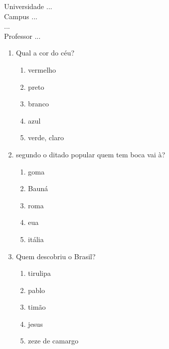 \documentclass[10pt,a4paper,twocolumn]{report}
\begin{document}
\begin{flushleft}
Universidade ...\\
Campus ...\\
...\\
Professor ...\\
\end{flushleft}




 \begin{enumerate} 
    \item  Qual a cor do céu?





    \begin{enumerate}
    \item  vermelho

\item  preto

\item  branco

\item  azul

\item  verde, claro


    \end{enumerate} 
    \item  segundo o ditado popular quem tem boca vai à?





    \begin{enumerate}
    \item  goma

\item  Bauná

\item  roma

\item  eua

\item  itália


    \end{enumerate} 
    \item  Quem descobriu o Brasil?





    \begin{enumerate}
    \item  tirulipa

\item  pablo

\item  timão

\item  jesus

\item  zeze de camargo


    \end{enumerate}\end{enumerate} 
\end{document}
